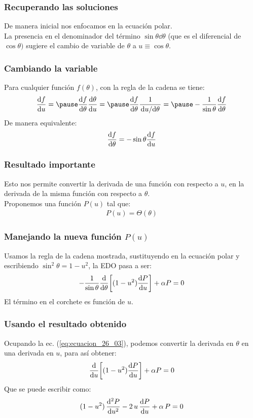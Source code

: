 \documentclass[12pt]{beamer}
\begin{document}
\begin{frame}
\frametitle{Recuperando las soluciones}
De manera inicial nos enfocamos en la ecuación polar.
\\
\bigskip
\pause
La presencia en el denominador del término $\sin \theta \dd{\theta}$ (que es el diferencial de $\cos \theta)$ sugiere el cambio de variable de $\theta$ a $u \equiv \cos \theta$.
\end{frame}
\begin{frame}
\frametitle{Cambiando la variable}
Para cualquier función $f(\theta)$, con la regla de la cadena se tiene:
\begin{eqnarray*}
\dv{f}{u} = \pause \dv{f}{\theta} \dv{\theta}{u} = \pause \dv{f}{\theta} \dfrac{1}{\dv*{u}{\theta}} = \pause - \dfrac{1}{\sin \theta} \dv{f}{\theta}
\end{eqnarray*}
\pause
De manera equivalente:
\begin{align}
\dv{f}{\theta} = - \sin \theta \dv{f}{u}
\label{eq:ecuacion_26_03}
\end{align}
\end{frame}
\begin{frame}
\frametitle{Resultado importante}
Esto nos permite convertir la derivada de una función con respecto a $u$, en la derivada de la misma función con respecto a $\theta$.
\\
\bigskip
\pause
Proponemos una función $P(u)$ tal que:
\begin{align*}
P(u) = \Theta(\theta)
\end{align*}
\end{frame}
\begin{frame}
\frametitle{Manejando la nueva función $P(u)$}
Usamos la regla de la cadena mostrada, sustituyendo en la ecuación polar y escribiendo $\sin^{2} \theta = 1 - u^{2}$, la EDO pasa a ser:
\pause
\begin{align*}
- \dfrac{1}{\sin \theta} \dv{\theta} \bigg[ (1 - u^{2}) \dv{P}{u} \bigg] + \alpha P = 0
\end{align*}
\pause
El término en el corchete es función de $u$.
\end{frame}
\begin{frame}
\frametitle{Usando el resultado obtenido}
Ocupando la ec. (\ref{eq:ecuacion_26_03}), podemos convertir la derivada en $\theta$ en una derivada en $u$, para así obtener:
\begin{align}
\dv{u} \bigg[ (1 - u^{2}) \dv{P}{u} \bigg] + \alpha P = 0
\label{eq:ecuacion_26_04}
\end{align}
\pause
Que se puede escribir como:
\begin{align}
(1 - u^{2}) \, \dv[2]{P}{u} - 2 \, u \, \dv{P}{u} + \alpha \, P = 0
\label{eq:ecuacion_26_05}
\end{align}
\end{frame}
\end{document}
